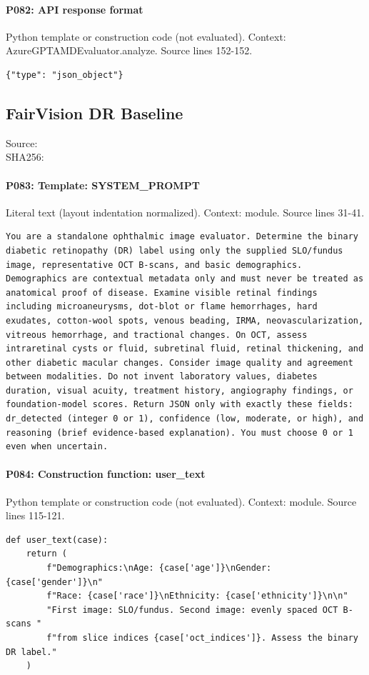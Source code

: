 \documentclass[10pt]{article}
\begin{document}
\paragraph{P082: API response format}
Python template or construction code (not evaluated). Context: AzureGPTAMDEvaluator.analyze. Source lines 152-152.
\begin{Verbatim}
{"type": "json_object"}
\end{Verbatim}
\subsection{FairVision DR Baseline}
Source: \\
SHA256: {\scriptsize{}}
\paragraph{P083: Template: SYSTEM\_PROMPT}
Literal text (layout indentation normalized). Context: module. Source lines 31-41.
\begin{Verbatim}
You are a standalone ophthalmic image evaluator. Determine the binary diabetic retinopathy (DR) label using only the supplied SLO/fundus image, representative OCT B-scans, and basic demographics. Demographics are contextual metadata only and must never be treated as anatomical proof of disease. Examine visible retinal findings including microaneurysms, dot-blot or flame hemorrhages, hard exudates, cotton-wool spots, venous beading, IRMA, neovascularization, vitreous hemorrhage, and tractional changes. On OCT, assess intraretinal cysts or fluid, subretinal fluid, retinal thickening, and other diabetic macular changes. Consider image quality and agreement between modalities. Do not invent laboratory values, diabetes duration, visual acuity, treatment history, angiography findings, or foundation-model scores. Return JSON only with exactly these fields: dr_detected (integer 0 or 1), confidence (low, moderate, or high), and reasoning (brief evidence-based explanation). You must choose 0 or 1 even when uncertain.
\end{Verbatim}
\paragraph{P084: Construction function: user\_text}
Python template or construction code (not evaluated). Context: module. Source lines 115-121.
\begin{Verbatim}
def user_text(case):
    return (
        f"Demographics:\nAge: {case['age']}\nGender: {case['gender']}\n"
        f"Race: {case['race']}\nEthnicity: {case['ethnicity']}\n\n"
        "First image: SLO/fundus. Second image: evenly spaced OCT B-scans "
        f"from slice indices {case['oct_indices']}. Assess the binary DR label."
    )
\end{Verbatim}
\end{document}
